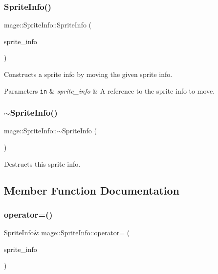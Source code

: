 \subsubsection{\texorpdfstring{Sprite\+Info()}{SpriteInfo()}\hspace{0.1cm}{\footnotesize\ttfamily [3/3]}}
{\footnotesize\ttfamily mage\+::\+Sprite\+Info\+::\+Sprite\+Info (\begin{DoxyParamCaption}\item[{\hyperlink{structmage_1_1_sprite_info}{Sprite\+Info} \&\&}]{sprite\+\_\+info }\end{DoxyParamCaption})\hspace{0.3cm}{\ttfamily [default]}}

Constructs a sprite info by moving the given sprite info.


\begin{DoxyParams}[1]{Parameters}
\mbox{\tt in}  & {\em sprite\+\_\+info} & A reference to the sprite info to move. \\
\hline
\end{DoxyParams}
\hypertarget{structmage_1_1_sprite_info_a17d9161b88c7f920419ae9aaf8c11299}{}\label{structmage_1_1_sprite_info_a17d9161b88c7f920419ae9aaf8c11299} 
\subsubsection{\texorpdfstring{$\sim$\+Sprite\+Info()}{~SpriteInfo()}}
{\footnotesize\ttfamily mage\+::\+Sprite\+Info\+::$\sim$\+Sprite\+Info (\begin{DoxyParamCaption}{ }\end{DoxyParamCaption})\hspace{0.3cm}{\ttfamily [default]}}

Destructs this sprite info. 

\subsection{Member Function Documentation}
\hypertarget{structmage_1_1_sprite_info_a843c253e10ec7fd90412b5adb6ccc17f}{}\label{structmage_1_1_sprite_info_a843c253e10ec7fd90412b5adb6ccc17f} 
\subsubsection{\texorpdfstring{operator=()}{operator=()}\hspace{0.1cm}{\footnotesize\ttfamily [1/2]}}
{\footnotesize\ttfamily \hyperlink{structmage_1_1_sprite_info}{Sprite\+Info}\& mage\+::\+Sprite\+Info\+::operator= (\begin{DoxyParamCaption}\item[{const \hyperlink{structmage_1_1_sprite_info}{Sprite\+Info} \&}]{sprite\+\_\+info }\end{DoxyParamCaption})\hspace{0.3cm}{\ttfamily [default]}}


